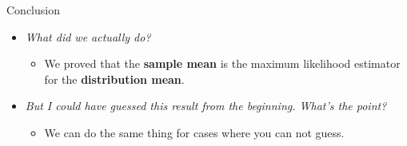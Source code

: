\documentclass[10pt, aspectratio=169]{beamer} %
\begin{document}
\begin{frame}[allowframebreaks=0.8]
{Conclusion}

\begin{itemize}
\item \textit{What did we actually do?}
\begin{itemize}
\item We proved that the \textbf{sample mean} is the maximum likelihood estimator for the \textbf{distribution mean}.
\end{itemize}

\item \textit{But I could have guessed this result from the beginning. What's the point?}
\begin{itemize}
\item We can do the same thing for cases where you can not guess.
\end{itemize}
\end{itemize}
\end{frame}
\end{document}
